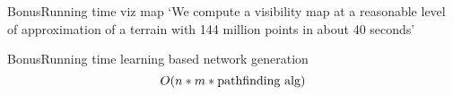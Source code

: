 \begin{frame}{Bonus}{Running time viz map}
	\centering\Large
	`We compute a visibility map at a reasonable level of approximation of a terrain with 144 million points in about 40 seconds'
\end{frame}

\begin{frame}{Bonus}{Running time learning based network generation}
	\[
		O(n * m * \textnormal{pathfinding alg})
	\]

\end{frame}

